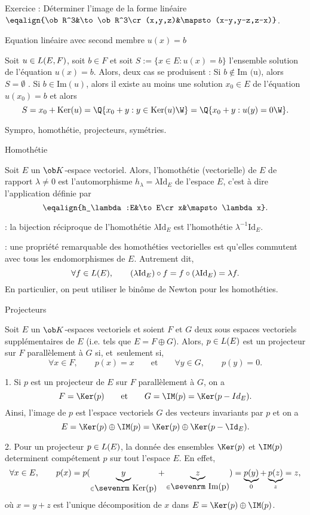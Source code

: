  Exercice :  Déterminer l'image de la forme linéaire $\eqalign{\ob R^3&\to\ob R^3\cr(x,y,z)&\mapsto  (x-y,y-z,z-x)}$.
\bigskip

\Concept [] Equation linéaire avec second membre $u(x)=b$

\Propriete [] Soit $u\in\sc L(E,F)$, soit $b\in F$ et soit $S:=\{x\in E:u(x)=b\}$ l'ensemble solution de l'équation $u(x)=b$. 
Alors, deux cas se produisent : 
\smallskip\noindent
Si $b\notin\mbox{Im (u)}$, alors  $S=\emptyset$ . 
\smallskip
\noindent
Si $b\in\mbox{Im}(u)$, alors il existe au moins une solution $x_0\in E$ de l'équation $u(x_0)=b$ et alors 
$$
S=x_0+\mbox{Ker}(u)=\Q\{x_0+y:y\in\mbox{Ker}(u)\W\}=\Q\{x_0+y:u(y)=0\W\}.
$$ 

\Subsection Sympro, homothétie, projecteurs, symétries.


\Concept [] Homothétie

Soit $E$ un $\ob K$-espace vectoriel. Alors, l'homothétie (vectorielle) de $E$ de rapport $\lambda\neq0$ est 
{l'automorphisme $h_\lambda=\lambda\mbox{Id}_E$} de l'espace $E$, c'est à dire l'application définie par
$$
\eqalign{h_\lambda:E&\to E\cr x&\mapsto \lambda x}.
$$ 


\Remarque : la bijection réciproque de l'homothétie $\lambda\mbox{Id}_E$ est l'homothétie $\lambda^{-1}\mbox{Id}_E$. 
\bigskip


\Remarque : une propriété remarquable des homothéties vectorielles est qu'elles commutent avec tous les endomorphismes de $E$. 
Autrement dit, 
$$
\forall f\in\sc L(E), \qquad (\lambda\mbox{Id}_E)\circ f=f\circ(\lambda\mbox{Id}_E)=\lambda f.
$$
En particulier, on peut utiliser le binôme de Newton pour les homothéties. 
\bigskip

\Concept [Index=Projection] Projecteurs

\noindent
Soit $E$ un $\ob K$-espaces vectoriels et soient $F$ et $G$ deux sous espaces vectoriels sup\-plé\-men\-tai\-res de $E$ (i.e. tels que $E=F\oplus G$). 
Alors, $p\in\sc L(E)$ est un projecteur sur $F$ parallèlement à $G$ si, et~seulement si, 
$$
\forall x\in F ,\qquad  p(x)=x \qquad\mbox{et}\qquad\forall y\in G , \qquad  p(y)=0 .
$$

\Remarque{} 1. Si $p$ est un projecteur de $E$ sur $F$ parallèlement à $G$, on a 
$$
F=\Ker(p) \qquad\mbox{et}\qquad  G=\IM(p)=\Ker(p-Id_E) .
$$
Ainsi, l'image de $p$ est l'espace vectoriels $G$ des vecteurs invariants par $p$ et on a 
$$
E=\Ker(p)\oplus\IM(p)=\Ker(p)\oplus\Ker(p-\Id_E).
$$

\Remarque{} 2. Pour un projecteur $p\in\sc L(E)$, la donnée des ensembles $\Ker(p)$ et $\IM(p)$ determinent compétement $p$ sur tout l'espace $E$. En effet, 
$$
\forall x\in E, \qquad p(x)=p(\underbrace{y}_{\in\mbox{\sevenrm Ker(p)}}+\underbrace{z}_{\in\mbox{\sevenrm Im(p)}})=\underbrace{p(y)}_0+\underbrace{p(z)}_{z}=z,
$$
où $x=y+z$ est l'unique décomposition de $x$ dans $E=\Ker(p)\oplus\IM(p)$. 
\bigskip

